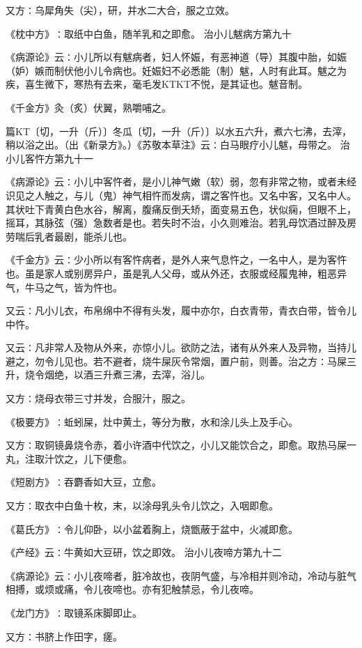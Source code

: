 \documentclass[a4paper,12pt,UTF8,twoside]{ctexbook}
\begin{document}
又方∶乌犀角失（尖），研，并水二大合，服之立效。

《枕中方》∶取纸中白鱼，随羊乳和之即愈。
治小儿魃病方第九十

《病源论》云∶小儿所以有魃病者，妇人怀娠，有恶神道（导）其腹中胎，如娠（妒）嫉而制伏他小儿令病也。妊娠妇不必悉能（制）魃，人时有此耳。魃之为疾，喜生微下，寒热有去来，毫毛发KTKT不悦，是其证也。魃音制。

《千金方》灸（炙）伏翼，熟嚼哺之。

篇KT〔切，一升（斤）〕冬瓜〔切，一升（斤）〕以水五六升，煮六七沸，去滓，稍以浴之出。（出《新录方》。）《苏敬本草注》云∶白马眼疗小儿魃，母带之。
治小儿客忤方第九十一

《病源论》云∶小儿中客忤者，是小儿神气嫩（软）弱，忽有非常之物，或者未经识见之人触之，与儿（鬼）神气相忤而发病，谓之客忤也。又名中客，又名中人。其状吐下青黄白色水谷，解离，腹痛反倒夭矫，面变易五色，状似痫，但眼不上，摇耳，其脉弦（强）急数者是也。若失时不治，小久则难治。若乳母饮酒过醉及房劳喘后乳者最剧，能杀儿也。

《千金方》云∶少小所以有客忤病者，是外人来气息忤之，一名中人，是为客忤也。虽是家人或别房异户，虽是乳人父母，或从外还，衣服或经履鬼神，粗恶异气，牛马之气，皆为忤也。

又云∶凡小儿衣，布帛绵中不得有头发，履中亦尔，白衣青带，青衣白带，皆令儿中忤。

又云∶凡非常人及物从外来，亦惊小儿。欲防之法，诸有从外来人及异物，当持儿避之，勿令儿见也。若不避者，烧牛屎灰令常烟，置户前，则善。治之方∶马屎三升，烧令烟绝，以酒三升煮三沸，去滓，浴儿。

又方∶烧母衣带三寸并发，合服汁，服之。

《极要方》∶蚯蚓屎，灶中黄土，等分为散，水和涂儿头上及手心。

又方∶取铜镜鼻烧令赤，着小许酒中代饮之，小儿又能饮合之，即愈。取热马屎一丸，注取汁饮之，儿下便愈。

《短剧方》∶吞麝香如大豆，立愈。

又方∶取衣中白鱼十枚，末，以涂母乳头令儿饮之，入咽即愈。

《葛氏方》∶令儿仰卧，以小盆着胸上，烧甑蔽于盆中，火减即愈。

《产经》云∶牛黄如大豆研，饮之即效。
治小儿夜啼方第九十二

《病源论》云∶小儿夜啼者，脏冷故也，夜阴气盛，与冷相并则冷动，冷动与脏气相搏，或烦或痛，令儿夜啼也。亦有犯触禁忌，令儿夜啼。

《龙门方》∶取镜系床脚即止。

又方∶书脐上作田字，瘥。
\end{document}
